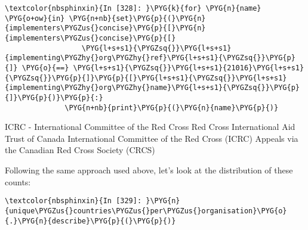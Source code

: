 \documentclass[letterpaper,10pt,english]{sphinxmanual}
\begin{document}
\begin{Verbatim}[commandchars=\\\{\}]
\textcolor{nbsphinxin}{In [328]: }\PYG{k}{for} \PYG{n}{name} \PYG{o+ow}{in} \PYG{n+nb}{set}\PYG{p}{(}\PYG{n}{implementers\PYGZus{}concise}\PYG{p}{[}\PYG{n}{implementers\PYGZus{}concise}\PYG{p}{[}
                  \PYG{l+s+s1}{\PYGZsq{}}\PYG{l+s+s1}{implementing\PYGZhy{}org\PYGZhy{}ref}\PYG{l+s+s1}{\PYGZsq{}}\PYG{p}{]} \PYG{o}{==} \PYG{l+s+s1}{\PYGZsq{}}\PYG{l+s+s1}{21016}\PYG{l+s+s1}{\PYGZsq{}}\PYG{p}{]}\PYG{p}{[}\PYG{l+s+s1}{\PYGZsq{}}\PYG{l+s+s1}{implementing\PYGZhy{}org\PYGZhy{}name}\PYG{l+s+s1}{\PYGZsq{}}\PYG{p}{]}\PYG{p}{)}\PYG{p}{:}
              \PYG{n+nb}{print}\PYG{p}{(}\PYG{n}{name}\PYG{p}{)}
\end{Verbatim}
%
\begin{OriginalVerbatim}[commandchars=\\\{\}]
ICRC - International Committee of the Red Cross
Red Cross International Aid Trust of Canada
International Committee of the Red Cross (ICRC) Appeals via the Canadian Red Cross Society (CRCS)
\end{OriginalVerbatim}
\relax
Following the same approach used above, let's look at the distribution
of these counts:

\begin{Verbatim}[commandchars=\\\{\}]
\textcolor{nbsphinxin}{In [329]: }\PYG{n}{unique\PYGZus{}countries\PYGZus{}per\PYGZus{}organisation}\PYG{o}{.}\PYG{n}{describe}\PYG{p}{(}\PYG{p}{)}
\end{Verbatim}
\end{document}
